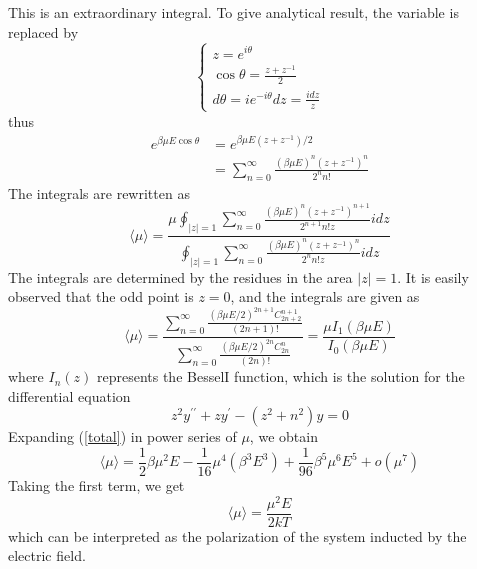 \documentclass[%
 reprint,
 amsmath,amssymb,
 aps,
10.5pt,
]{revtex4-1}
\begin{document}
This is an extraordinary integral. To give analytical
result, the variable is replaced by
\begin{equation}
\left\{ \begin{array} { l } { z = e ^ { i \theta } } \\ { \cos \theta = \frac { z + z ^ { - 1 } } { 2 } } \\ { d \theta = i e ^ { - i \theta } d z = \frac { i d z } { z } } \end{array} \right.
\end{equation}
thus
\begin{equation}
\begin{aligned} 
e ^ { \beta \mu E \cos \theta } & = e ^ { \beta \mu E \left( z + z ^ { - 1 } \right) / 2 } \\ 
& = \sum _ { n = 0 } ^ { \infty } \frac { ( \beta \mu E ) ^ { n } \left( z + z ^ { - 1 } \right) ^ { n } } { 2 ^ { n } n ! } 
\end{aligned}
\end{equation}
The integrals are rewritten as
\begin{equation}
  \langle \mu \rangle = \frac { \mu \oint _ { | z | = 1 } \sum _ { n = 0 } ^ { \infty } \frac { ( \beta \mu E ) ^ { n } \left( z + z ^ { - 1 } \right) ^ { n + 1 } } { 2 ^ { n + 1 } n ! z } i d z } { \oint _ { | z | = 1 } \sum _ { n = 0 } ^ { \infty } \frac { ( \beta \mu E ) ^ { n } \left( z + z ^ { - 1 } \right) ^ { n } } { 2 ^ { n } n ! z } i d z }
\end{equation}
The integrals are determined by the residues in the area
$|z| = 1$. It is easily observed that the odd point is $z = 0$,
and the integrals are given as
\begin{equation}
  \langle \mu \rangle = \frac { \sum _ { n = 0 } ^ { \infty } \frac { ( \beta \mu E / 2 ) ^ { 2 n + 1 } C _ { 2 n + 2 } ^ { n + 1 } } { ( 2 n + 1 ) ! } } { \sum _ { n = 0 } ^ { \infty } \frac { ( \beta \mu E / 2 ) ^ { 2 n } C _ { 2 n } ^ { n } } { ( 2 n ) ! } } = \frac { \mu I _ { 1 } ( \beta \mu E ) } { I _ { 0 } ( \beta \mu E ) }
  \label{total}
\end{equation}
where $I_n(z)$ represents the BesselI function, which is the
solution for the differential equation
\begin{equation}
  z ^ { 2 } y ^ { \prime \prime } + z y ^ { \prime } - \left( z ^ { 2 } + n ^ { 2 } \right) y = 0
\end{equation}
Expanding (\ref{total}) in power series of $\mu$, we obtain
\begin{equation}
  \langle \mu \rangle = \frac { 1 } { 2 } \beta \mu ^ { 2 } E - \frac { 1 } { 16 } \mu ^ { 4 } \left( \beta ^ { 3 } E ^ { 3 } \right) + \frac { 1 } { 96 } \beta ^ { 5 } \mu ^ { 6 } E ^ { 5 } + o \left( \mu ^ { 7 } \right)
\end{equation}
Taking the first term, we get
\begin{equation}
  \langle \mu \rangle = \frac { \mu ^ { 2 } E } { 2 k T }
\end{equation}
which can be interpreted as the polarization of the system
inducted by the electric field. 
\end{document}
